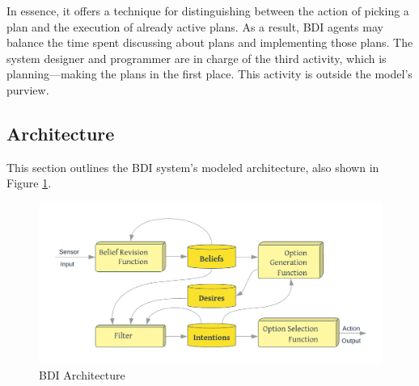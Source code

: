\vspace{.5cm}

In essence, it offers a technique for distinguishing between the action of picking a plan and the execution of already active plans. As a result, \ac{BDI} agents may balance the time spent discussing about plans and implementing those plans. The system designer and programmer are in charge of the third activity, which is planning—making the plans in the first place. This activity is outside the model's purview.

\subsection{Architecture}

This section outlines the \ac{BDI} system's modeled architecture, also shown in Figure \ref{BDI Architecture}.

    \begin{figure}[h]
    \centering
      \includegraphics[width=12cm]{includes/figures/BDI_arch.png}
      \caption{\ac{BDI} Architecture}
      \label{BDI Architecture}
    \end{figure}
    
